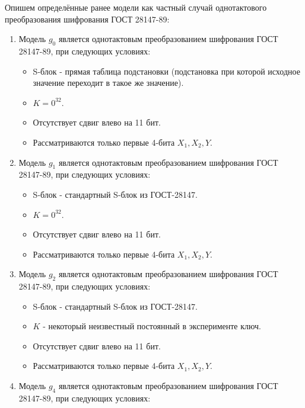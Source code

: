 \bigskip
Опишем определённые ранее модели как частный случай однотактового преобразования шифрования ГОСТ 28147-89:
\begin{enumerate}
	\item Модель $g_0$ является однотактовым преобразованием шифрования ГОСТ 28147-89, при следующих условиях:
	\begin{itemize}
		\item S-блок - прямая таблица подстановки (подстановка при которой исходное значение переходит в такое же значение).
		\item $K = 0^{32}$.
		\item Отсутствует сдвиг влево на 11 бит.
		\item Рассматриваются только первые 4-бита $X_1, X_2, Y$.
	\end{itemize}
	\item Модель $g_1$ является однотактовым преобразованием шифрования ГОСТ 28147-89, при следующих условиях:
	\begin{itemize}
		\item S-блок - стандартный S-блок из ГОСТ-28147.
		\item $K = 0^{32}$.
		\item Отсутствует сдвиг влево на 11 бит.
		\item Рассматриваются только первые 4-бита $X_1, X_2, Y$.
	\end{itemize}
	\item Модель $g_2$ является однотактовым преобразованием шифрования ГОСТ 28147-89, при следующих условиях:
	\begin{itemize}
		\item S-блок - стандартный S-блок из ГОСТ-28147.
		\item $K$ - некоторый неизвестный постоянный в эксперименте ключ.
		\item Отсутствует сдвиг влево на 11 бит.
		\item Рассматриваются только первые 4-бита $X_1, X_2, Y$.
	\end{itemize}
	\item Модель $g_4$ является однотактовым преобразованием шифрования ГОСТ 28147-89, при следующих условиях:
	\begin{itemize}

\end{itemize}
\end{enumerate}
